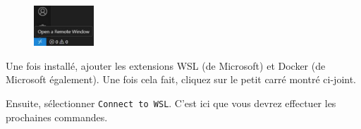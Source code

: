     \begin{figure}
        \centering
        \vspace*{-0.5cm}
        \includegraphics[width=0.2\textwidth]{Images_formation/connect_to_wsl.pdf}
    \end{figure}
    Une fois \vscode{} installé, ajouter les extensions WSL (de Microsoft) et Docker (de Microsoft également). Une fois cela fait, cliquez sur le petit carré montré ci-joint.

    Ensuite, sélectionner \verb|Connect to WSL|. C'est ici que vous devrez effectuer les prochaines commandes.